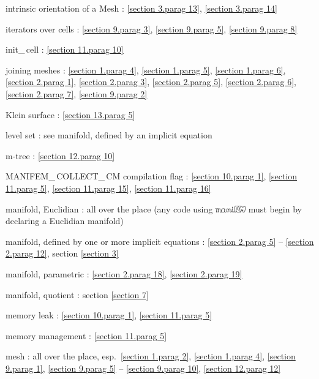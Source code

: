 \documentclass[a4paper]{scrreprt}
\def\numb{}
\newcommand\maniFEM{\leavevmode\hbox{\includegraphics[width=13mm]{manifem-small}}}
\newcommand\verm[1]{\textcolor{manif}{#1}}
\renewcommand\tt{\normalfont\ttfamily}
\begin{document}
\noindent
intrinsic orientation of a {\small\tt\verm{Mesh}} : \ref{\numb section 3.\numb parag 13},
\ref{\numb section 3.\numb parag 14}

\noindent
iterators over cells : \ref{\numb section 9.\numb parag 3}, \ref{\numb section 9.\numb parag 5},
\ref{\numb section 9.\numb parag 8}

\noindent
{\small\tt init\_\,cell} : \ref{\numb section 11.\numb parag 10}

\noindent
{\small\tt join}ing meshes : \ref{\numb section 1.\numb parag 4},
\ref{\numb section 1.\numb parag 5}, \ref{\numb section 1.\numb parag 6},
\ref{\numb section 2.\numb parag 1}, \ref{\numb section 2.\numb parag 3},
\ref{\numb section 2.\numb parag 5}, \ref{\numb section 2.\numb parag 6},
\ref{\numb section 2.\numb parag 7}, \ref{\numb section 9.\numb parag 2}

\noindent
Klein surface : \ref{\numb section 13.\numb parag 5}

\noindent
level set : see manifold, defined by an implicit equation

\noindent
m-tree : \ref{\numb section 12.\numb parag 10}

\noindent
{\small\tt MANIFEM\_\,COLLECT\_\,CM} compilation flag : \ref{\numb section 10.\numb parag 1},
\ref{\numb section 11.\numb parag 5}, \ref{\numb section 11.\numb parag 15},
\ref{\numb section 11.\numb parag 16}

\noindent
manifold, Euclidian : all over the place\hfil\break
\hglue 9mm (any code using {\maniFEM} must begin by declaring a Euclidian manifold)

\noindent
manifold, defined by one or more implicit equations :
\ref{\numb section 2.\numb parag 5} -- \ref{\numb section 2.\numb parag 12},
section \ref{\numb section 3}

\noindent
manifold, parametric : \ref{\numb section 2.\numb parag 18},
\ref{\numb section 2.\numb parag 19}

\noindent
manifold, quotient : section \ref{\numb section 7}

\noindent
memory leak : \ref{\numb section 10.\numb parag 1}, \ref{\numb section 11.\numb parag 5}

\noindent
memory management : \ref{\numb section 11.\numb parag 5}

\noindent
mesh : all over the place, esp.\ \ref{\numb section 1.\numb parag 2},
\ref{\numb section 1.\numb parag 4}, \ref{\numb section 9.\numb parag 1},
\ref{\numb section 9.\numb parag 5} -- \ref{\numb section 9.\numb parag 10},
\ref{\numb section 12.\numb parag 12}
\end{document}
